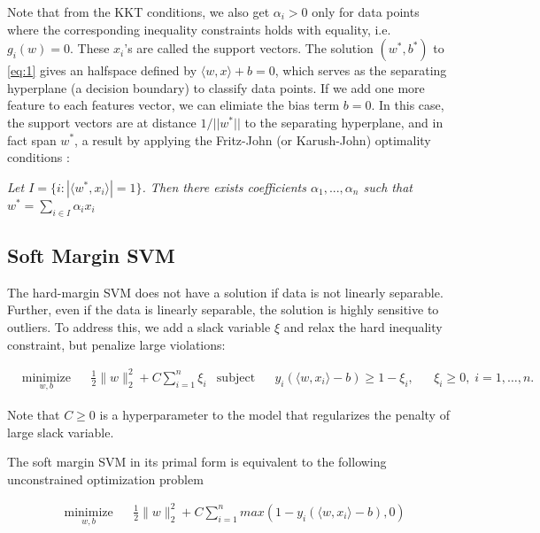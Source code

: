 \documentclass[10pt]{article}
\begin{document}
Note that from the KKT conditions, we also get $\alpha_i > 0 $ only for data points where the corresponding inequality constraints holds with equality, i.e. $g_i(w) = 0$. These $x_i$'s are called the support vectors. The solution $(w^*, b^*)$ to \eqref{eq:1} gives an halfspace defined by $\langle w, x\rangle + b = 0$, which serves as the separating hyperplane (a decision boundary) to classify data points. If we add one more feature to each features vector, we can elimiate the bias term $b = 0$. In this case, the support vectors are at distance $1/||w^*||$ to the separating hyperplane, and in fact span $w^*$, a result by applying the Fritz-John (or Karush-John) optimality conditions \cite{Shalev-Shwartz:2014:UML:2621980}:

\begin{center}
	\textit{Let $I = \{i: |\langle w^*, x_i\rangle| = 1\}$. Then there exists coefficients $\alpha_1,...,\alpha_n$ such that $w^*  = \sum_{i \in I}^{}\alpha_i x_i$}
\end{center}

\subsection{Soft Margin SVM}
The hard-margin SVM does not have a solution if data is not linearly separable. Further, even if the data is linearly separable, the solution is highly sensitive to outliers. To address this, we add a slack variable $\xi$ and relax the hard inequality constraint, but penalize large violations:

\begin{equation}\label{eq:1}
\begin{aligned}
& \underset{w,b}{\text{minimize}}
& & \frac{1}{2} \lVert w \rVert_{2}^2 + C \sum_{i=1}^{n}\xi_i
& \text{subject to}
& & y_i(\langle w,x_i \rangle - b) \geq 1 - \xi_i,
& & \xi_i \geq 0, \; i = 1, \ldots, n.
\end{aligned}
\end{equation} 

Note that $C \geq 0$ is a hyperparameter to the model that regularizes the penalty of large slack variable.  

The soft margin SVM in its primal form is equivalent to the following unconstrained optimization problem

\begin{equation}\label{eq:8}
\begin{aligned}
& \underset{w,b}{\text{minimize}}
& & \frac{1}{2} \lVert w \rVert_{2}^2 + C \sum_{i=1}^{n}max(1 - y_i(\langle w, x_i\rangle-b), 0)
\end{aligned}
\end{equation} 
\end{document}
